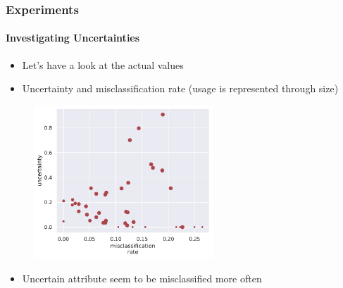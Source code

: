 \documentclass[9pt]{beamer}
\begin{document}
\begin{frame}	
\frametitle{Experiments}
\framesubtitle{Investigating Uncertainties}
\begin{itemize}
	\item Let's have a look at the actual values
	\item Uncertainty and misclassification rate (usage is represented through size)
\end{itemize}
	\begin{figure}
		\centering
		\includegraphics[width=0.6\textwidth]{images/error_sigma_corr_all.pdf} 
	\end{figure}
	\begin{itemize}
		\item Uncertain attribute seem to be misclassified more often
	\end{itemize}
\end{frame} 
\end{document}
